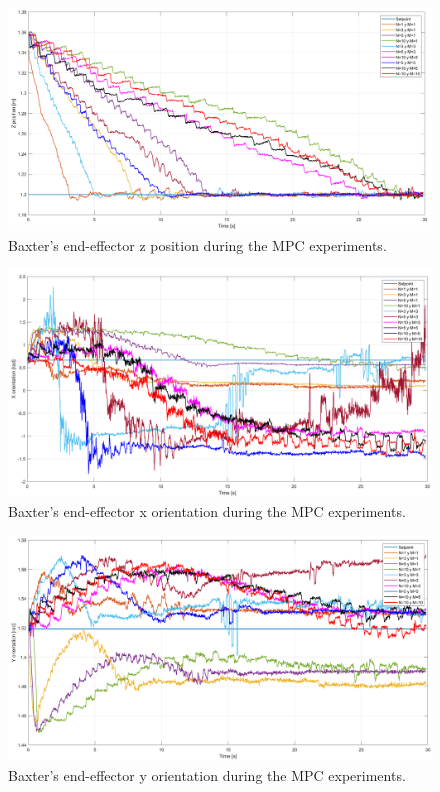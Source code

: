 \documentclass[11pt]{report} %
\begin{document}
\begin{figure}[H]
    \centering
    \includegraphics[width=1.0\linewidth]{assets/imgs/control_theory/mpc_tests/z_pose.png}
    \caption{Baxter's end-effector z position during the MPC experiments.} 
    \label{fig_baxter_z_pose_mpc_experiments}
\end{figure}

\begin{figure}[H]
    \centering
    \includegraphics[width=1.0\linewidth]{assets/imgs/control_theory/mpc_tests/x_orientation.png}
    \caption{Baxter's end-effector x orientation during the MPC experiments.} 
    \label{fig_baxter_x_orientation_mpc_experiments}
\end{figure}

\begin{figure}[H]
    \centering
    \includegraphics[width=1.0\linewidth]{assets/imgs/control_theory/mpc_tests/y_orientation.png}
    \caption{Baxter's end-effector y orientation during the MPC experiments.} 
    \label{fig_baxter_y_orientation_mpc_experiments}
\end{figure}
\end{document}
